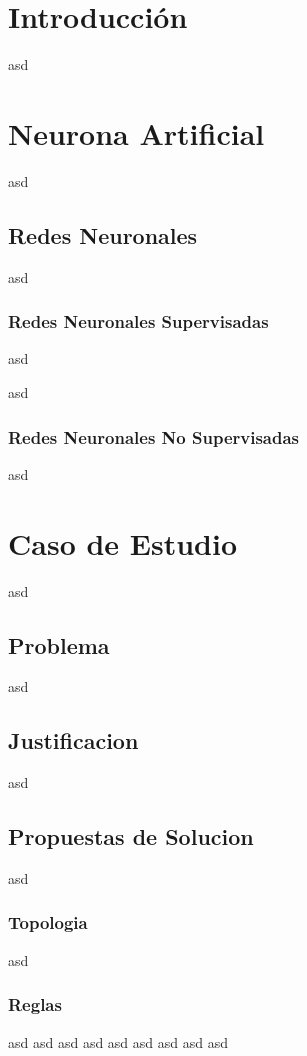 \documentclass[12pt]{article}
\title{}
\newcounter{subsubsubsection}[subsubsection]
\newcounter{subsubsubsubsection}[subsubsubsection]
\begin{document}
\tableofcontents

\section{Introducción}
asd

\section{Neurona Artificial}
asd

\subsection{Redes Neuronales}
asd

\subsubsection{Redes Neuronales Supervisadas}
asd

asd
\subsubsection{Redes Neuronales No Supervisadas}
asd


\section{Caso de Estudio}
asd
\subsection{Problema}
asd
\subsection{Justificacion}
asd
\subsection{Propuestas de Solucion}
asd
\subsubsection{Topologia}
asd
\subsubsection{Reglas}
asd
asd
asd
asd
asd
asd
asd
asd
asd
\end{document}
